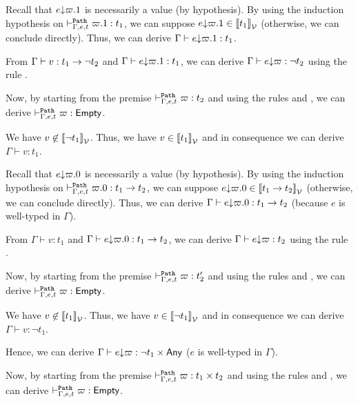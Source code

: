 \documentclass[a4paper]{article}
\theoremstyle{definition}
\begin{document}
\begin{description}
          Recall that $e{\downarrow}\varpi.1$ is necessarily a value (by hypothesis).
          By using the induction hypothesis on $\vdash^{\texttt{Path}}_{\Gamma,e,t} \varpi.1:t_1$, we can suppose $e{\downarrow}\varpi.1 \in {\llbracket t_1 \rrbracket}_{\mathcal{V}}$ (otherwise, we can conclude directly).
          Thus, we can derive $\Gamma \vdash e{\downarrow}\varpi.1: t_1$.

          From $\Gamma \vdash v:t_1\to \neg t_2$ and $\Gamma \vdash e{\downarrow}\varpi.1: t_1$, we can derive $\Gamma \vdash e{\downarrow}\varpi: \neg t_2$
          using the rule .

          Now, by starting from the premise $\vdash^{\texttt{Path}}_{\Gamma,e,t} \varpi:t_2$ and using the rules  and , we can derive
          $\vdash^{\texttt{Path}}_{\Gamma,e,t} \varpi:\textsf{Empty}$.
        
          \item[\Rule{PAppR}] We have $v \not\in {\llbracket \neg t_1 \rrbracket}_{\mathcal{V}}$. Thus, we have $v \in {\llbracket t_1 \rrbracket}_{\mathcal{V}}$ and in consequence
          we can derive $\Gamma \vdash v:t_1$. 

          Recall that $e{\downarrow}\varpi.0$ is necessarily a value (by hypothesis).
          By using the induction hypothesis on $\vdash^{\texttt{Path}}_{\Gamma,e,t} \varpi.0:t_1\to t_2$, we can suppose $e{\downarrow}\varpi.0 \in {\llbracket t_1\to t_2 \rrbracket}_{\mathcal{V}}$ (otherwise, we can conclude directly).
          Thus, we can derive $\Gamma \vdash e{\downarrow}\varpi.0: t_1\to t_2$ (because $e$ is well-typed in $\Gamma$).

          From $\Gamma \vdash v:t_1$ and $\Gamma \vdash e{\downarrow}\varpi.0: t_1\to t_2$, we can derive $\Gamma \vdash e{\downarrow}\varpi: t_2$
          using the rule .

          Now, by starting from the premise $\vdash^{\texttt{Path}}_{\Gamma,e,t} \varpi:t_2'$ and using the rules  and , we can derive
          $\vdash^{\texttt{Path}}_{\Gamma,e,t} \varpi:\textsf{Empty}$.

          \item[\Rule{PPairL}] We have $v \not\in {\llbracket t_1 \rrbracket}_{\mathcal{V}}$. Thus, we have $v \in {\llbracket \neg t_1 \rrbracket}_{\mathcal{V}}$
          and in consequence we can derive $\Gamma \vdash v:\neg t_1$.

          Hence, we can derive $\Gamma \vdash e{\downarrow}\varpi:\neg t_1\times \textsf{Any}$ ($e$ is well-typed in $\Gamma$).
     
          Now, by starting from the premise $\vdash^{\texttt{Path}}_{\Gamma,e,t} \varpi:t_1\times t_2$ and using the rules  and ,
          we can derive $\vdash^{\texttt{Path}}_{\Gamma,e,t} \varpi:\textsf{Empty}$.


\end{description}
\end{document}
